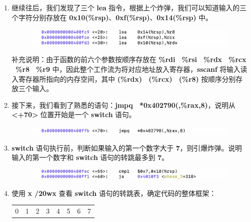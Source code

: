\begin{enumerate}
\begin{figure}[htbp]
                \end{figure}
            \newpage
            \item 继续往后，我们发现了三个 \textbf{lea} 指令，根据上个炸弹，我们可以知道输入的三个字符分别存放在 \textbf{0x10(\%rsp)}、\textbf{0xf(\%rsp)}、\textbf{0x14(\%rsp)} 中。
                \begin{figure}[htbp]
                    \hspace*{1cm}
                    \includegraphics*[width = 12cm]{s3_2.png}
                \end{figure}
                \par 补充说明：由于函数的前六个参数按顺序存放在 \textbf{\%rdi \ \%rsi \ \%rdx \ \%rcx \ \%r8 \ \%r9} 中，因此整个工作流为将对应地址放入寄存器，\textbf{sscanf} 将输入读入寄存器所指向的内存空间，其中 \textbf{(\%rdx) \ (\%rcx) \ (\%r8)} 按顺序分别存放三个输入。
            \item 接下来，我们看到了熟悉的语句：\textbf{jmpq \ *0x402790(,\%rax,8)}，说明从 \textbf{<+70>} 位置开始是一个 \textbf{switch} 语句。
                \begin{figure}[htbp]
                    \hspace*{1cm}
                    \includegraphics*[width = 14cm]{s3_3.png}
                \end{figure}
            \item \textbf{switch} 语句执行前，判断如果输入的第一个数字大于 \textbf{7}，则引爆炸弹。说明输入的第一个数字和 \textbf{switch} 语句的转跳最多到 \textbf{7}。
                \begin{figure}[htbp]
                    \hspace*{1cm}
                    \includegraphics*[width = 14cm]{s3_4.png}
                \end{figure}
            \item 使用 \textbf{x /20wx } 查看 \textbf{switch} 语句的转跳表，确定代码的整体框架：
                \begin{tabular}{cccccccc}
                    0 & 1 & 2 & 3 & 4 & 5 & 6 & 7 \\

\end{tabular}
\end{enumerate}
